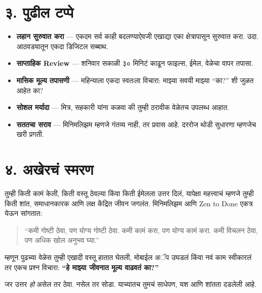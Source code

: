\section*{३. पुढील टप्पे}

\begin{itemize}
  \item \textbf{लहान सुरुवात करा} — एकदम सर्व काही बदलण्याऐवजी एखाद्या एका क्षेत्रापासून सुरुवात करा. उदा. आठवड्यातून एकदा डिजिटल सब्बाथ.  
  \item \textbf{साप्ताहिक Review} — शनिवार सकाळी ३० मिनिटं काढून फाइल्स, ईमेल, वेळेचा वापर तपासा.  
  \item \textbf{मासिक मूल्य तपासणी} — महिन्याला एकदा स्वतःला विचारा: माझ्या सवयी माझ्या “का?” शी जुळत आहेत का?  
  \item \textbf{सोशल मर्यादा} — मित्र, सहकारी यांना कळवा की तुम्ही ठरावीक वेळेतच उपलब्ध आहात.  
  \item \textbf{सततचा सराव} — मिनिमलिझम म्हणजे गंतव्य नाही, तर प्रवास आहे. दररोज थोडी सुधारणा म्हणजेच खरी प्रगती.  
\end{itemize}

\section*{४. अखेरचं स्मरण}

तुम्ही किती कामं केली, किती वस्तू ठेवल्या किंवा किती ईमेलला उत्तर दिलं, यापेक्षा महत्त्वाचं म्हणजे तुम्ही किती शांत, समाधानकारक आणि लक्ष केंद्रित जीवन जगलंत. मिनिमलिझम आणि Zen to Done एकत्र येऊन सांगतात:  

\begin{quote}
“कमी गोष्टी ठेवा, पण योग्य गोष्टी ठेवा.  
कमी कामं करा, पण योग्य कामं करा.  
कमी विचलन ठेवा, पण अधिक खोल अनुभव घ्या.”  
\end{quote}

म्हणून पुढच्या वेळेस तुम्ही एखादी वस्तू हातात घेतली, मोबाईल अॅप उघडलं किंवा नवं काम स्वीकारलं तर एकच प्रश्न विचारा:  
\textbf{“हे माझ्या जीवनात मूल्य वाढवतं का?”}  

जर उत्तर \textit{हो} असेल तर ठेवा. नसेल तर सोडा.  
याच्यातच तुमचं साधेपण, यश आणि शांतता दडलेली आहे.  
